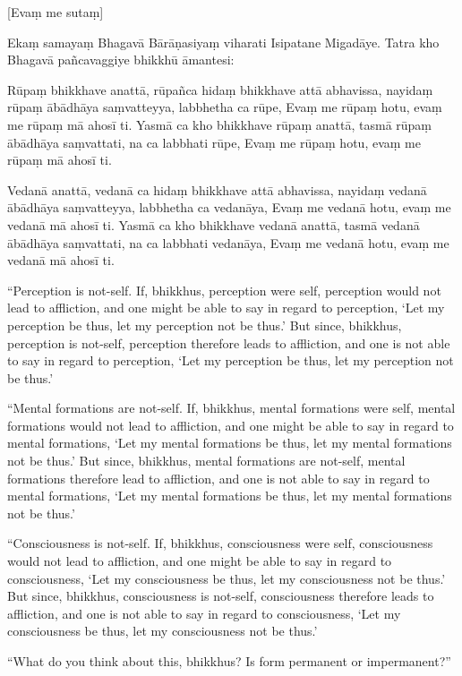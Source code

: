 [Evaṃ me sutaṃ]

Ekaṃ samayaṃ Bhagavā Bārāṇasiyaṃ viharati Isipatane Migadāye. Tatra kho
Bhagavā pañcavaggiye bhikkhū āmantesi:

Rūpaṃ bhikkhave anattā, rūpañca hidaṃ bhikkhave attā abhavissa, nayidaṃ
rūpaṃ ābādhāya saṃvatteyya, labbhetha ca rūpe, Evaṃ me rūpaṃ hotu, evaṃ
me rūpaṃ mā ahosī ti. Yasmā ca kho bhikkhave rūpaṃ anattā, tasmā rūpaṃ
ābādhāya saṃvattati, na ca labbhati rūpe, Evaṃ me rūpaṃ hotu, evaṃ me
rūpaṃ mā ahosī ti.

Vedanā anattā, vedanā ca hidaṃ bhikkhave attā abhavissa, nayidaṃ vedanā
ābādhāya saṃvatteyya, labbhetha ca vedanāya, Evaṃ me vedanā hotu, evaṃ
me vedanā mā ahosī ti. Yasmā ca kho bhikkhave vedanā anattā, tasmā
vedanā ābādhāya saṃvattati, na ca labbhati vedanāya, Evaṃ me vedanā
hotu, evaṃ me vedanā mā ahosī ti.

\clearpage

\englishText

``Perception is not-self. If, bhikkhus, perception were self, perception
would not lead to affliction, and one might be able to say in regard to
perception, `Let my perception be thus, let my perception not be thus.'
But since, bhikkhus, perception is not-self, perception therefore leads
to affliction, and one is not able to say in regard to perception, `Let
my perception be thus, let my perception not be thus.'

``Mental formations are not-self. If, bhikkhus, mental formations were
self, mental formations would not lead to affliction, and one might be
able to say in regard to mental formations, `Let my mental formations be
thus, let my mental formations not be thus.' But since, bhikkhus, mental
formations are not-self, mental formations therefore lead to affliction,
and one is not able to say in regard to mental formations, `Let my
mental formations be thus, let my mental formations not be thus.'

``Consciousness is not-self. If, bhikkhus, consciousness were self,
consciousness would not lead to affliction, and one might be able to say
in regard to consciousness, `Let my consciousness be thus, let my
consciousness not be thus.' But since, bhikkhus, consciousness is
not-self, consciousness therefore leads to affliction, and one is not
able to say in regard to consciousness, `Let my consciousness be thus,
let my consciousness not be thus.'

``What do you think about this, bhikkhus? Is form permanent or
impermanent?''

